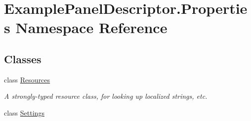 \hypertarget{namespace_example_panel_descriptor_1_1_properties}{}\section{Example\+Panel\+Descriptor.\+Properties Namespace Reference}
\label{namespace_example_panel_descriptor_1_1_properties}
\subsection*{Classes}
\begin{DoxyCompactItemize}
\item 
class \mbox{\hyperlink{class_example_panel_descriptor_1_1_properties_1_1_resources}{Resources}}
\begin{DoxyCompactList}\small\item\em A strongly-\/typed resource class, for looking up localized strings, etc. \end{DoxyCompactList}\item 
class \mbox{\hyperlink{class_example_panel_descriptor_1_1_properties_1_1_settings}{Settings}}
\end{DoxyCompactItemize}
